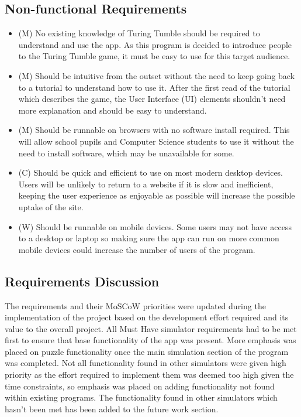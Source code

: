 \documentclass{l4proj}
\begin{document}
\subsection{Non-functional Requirements}
\begin{itemize}
    \item (M) No existing knowledge of Turing Tumble should be required to understand and use the app. As this program is decided to introduce people to the Turing Tumble game, it must be easy to use for this target audience.
    \item (M) Should be intuitive from the outset without the need to keep going back to a tutorial to understand how to use it. After the first read of the tutorial which describes the game, the User Interface (UI) elements shouldn't need more explanation and should be easy to understand.
    \item (M) Should be runnable on browsers with no software install required. This will allow school pupils and Computer Science students to use it without the need to install software, which may be unavailable for some.
    \item (C) Should be quick and efficient to use on most modern desktop devices. Users will be unlikely to return to a website if it is slow and inefficient, keeping the user experience as enjoyable as possible will increase the possible uptake of the site.
    \item (W) Should be runnable on mobile devices. Some users may not have access to a desktop or laptop so making sure the app can run on more common mobile devices could increase the number of users of the program.
\end{itemize}

\subsection{Requirements Discussion}
The requirements and their MoSCoW priorities were updated during the implementation of the project based on the development effort required and its value to the overall project. All Must Have simulator requirements had to be met first to ensure that base functionality of the app was present. More emphasis was placed on puzzle functionality once the main simulation section of the program was completed. Not all functionality found in other simulators were given high priority as the effort required to implement them was deemed too high given the time constraints, so emphasis was placed on adding functionality not found within existing programs. The functionality found in other simulators which hasn't been met has been added to the future work section.
\end{document}
